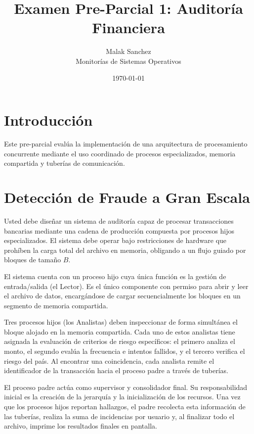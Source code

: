 \documentclass[12pt,a4paper]{article}
\title{\textbf{Examen Pre-Parcial 1: Auditoría Financiera}}
\author{Malak Sanchez \\ \small Monitorías de Sistemas Operativos}
\date{\today}
\begin{document}
\maketitle

\section*{Introducción}
Este pre-parcial evalúa la implementación de una arquitectura de procesamiento concurrente mediante el uso coordinado de procesos especializados, memoria compartida y tuberías de comunicación.

\section*{\textbf{Detección de Fraude a Gran Escala}}

Usted debe diseñar un sistema de auditoría capaz de procesar transacciones bancarias mediante una cadena de producción compuesta por procesos hijos especializados. El sistema debe operar bajo restricciones de hardware que prohíben la carga total del archivo en memoria, obligando a un flujo guiado por bloques de tamaño $B$.

\vspace{0.5cm}
El sistema cuenta con un proceso hijo cuya única función es la gestión de entrada/salida (el Lector). Es el único componente con permiso para abrir y leer el archivo de datos, encargándose de cargar secuencialmente los bloques en un segmento de memoria compartida.
\vspace{0.5cm}

Tres procesos hijos (los Analistas) deben inspeccionar de forma simultánea el bloque alojado en la memoria compartida. Cada uno de estos analistas tiene asignada la evaluación de criterios de riesgo específicos: el primero analiza el monto, el segundo evalúa la frecuencia e intentos fallidos, y el tercero verifica el riesgo del país. Al encontrar una coincidencia, cada analista remite el identificador de la transacción hacia el proceso padre a través de tuberías.

\vspace{0.5cm}
El proceso padre actúa como supervisor y consolidador final. Su responsabilidad inicial es la creación de la jerarquía y la inicialización de los recursos. Una vez que los procesos hijos reportan hallazgos, el padre recolecta esta información de las tuberías, realiza la suma de incidencias por usuario y, al finalizar todo el archivo, imprime los resultados finales en pantalla.
\end{document}
